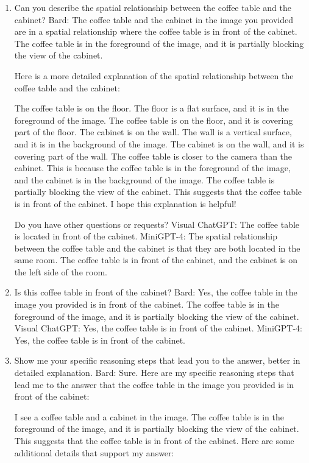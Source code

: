 \begin{enumerate}
    \item Can you describe the spatial relationship between the coffee table and the cabinet?
    \subitem Bard: 
    The coffee table and the cabinet in the image you provided are in a spatial relationship where the coffee table is in front of the cabinet. The coffee table is in the foreground of the image, and it is partially blocking the view of the cabinet.

    Here is a more detailed explanation of the spatial relationship between the coffee table and the cabinet:

    The coffee table is on the floor. The floor is a flat surface, and it is in the foreground of the image. The coffee table is on the floor, and it is covering part of the floor.
    The cabinet is on the wall. The wall is a vertical surface, and it is in the background of the image. The cabinet is on the wall, and it is covering part of the wall.
    The coffee table is closer to the camera than the cabinet. This is because the coffee table is in the foreground of the image, and the cabinet is in the background of the image.
    The coffee table is partially blocking the view of the cabinet. This suggests that the coffee table is in front of the cabinet.
    I hope this explanation is helpful!

    Do you have other questions or requests?
    \subitem Visual ChatGPT: The coffee table is located in front of the cabinet.
    \subitem MiniGPT-4: The spatial relationship between the coffee table and the cabinet is that they are both located in the same room. The coffee table is in front of the cabinet, and the cabinet is on the left side of the room.
    \item Is this coffee table in front of the cabinet?
    \subitem Bard: 
    Yes, the coffee table in the image you provided is in front of the cabinet. The coffee table is in the foreground of the image, and it is partially blocking the view of the cabinet.
    \subitem Visual ChatGPT: Yes, the coffee table is in front of the cabinet.
    \subitem MiniGPT-4: Yes, the coffee table is in front of the cabinet.
    \item Show me your specific reasoning steps that lead you to the answer, better in detailed explanation.
    \subitem Bard: Sure. Here are my specific reasoning steps that lead me to the answer that the coffee table in the image you provided is in front of the cabinet:

    I see a coffee table and a cabinet in the image.
    The coffee table is in the foreground of the image, and it is partially blocking the view of the cabinet.
    This suggests that the coffee table is in front of the cabinet.
    Here are some additional details that support my answer:
    

\end{enumerate}
